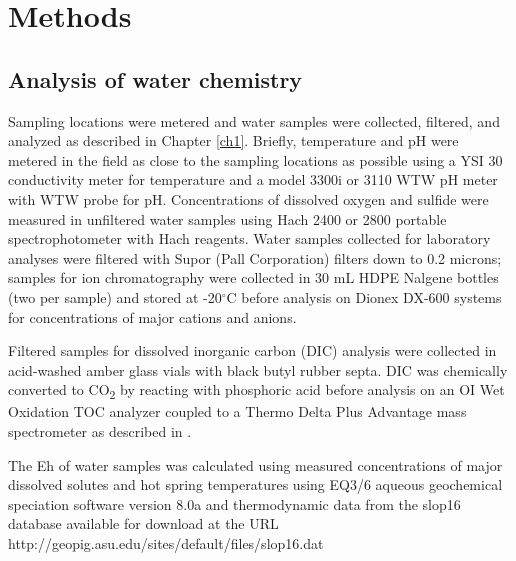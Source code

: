 \section{Methods}
\subsection{Analysis of water chemistry}
Sampling locations were metered and water samples were collected, filtered, and analyzed as described in Chapter \ref{ch1}. Briefly, temperature and pH were metered in the field as close to the sampling locations as possible using a YSI 30 conductivity meter for temperature and a model 3300i or 3110 WTW pH meter with WTW probe for pH. Concentrations of dissolved oxygen and sulfide were measured in unfiltered water samples using Hach 2400 or 2800 portable spectrophotometer with Hach reagents. Water samples collected for laboratory analyses were filtered with Supor (Pall Corporation) filters down to 0.2 microns; samples for ion chromatography were collected in 30 mL HDPE Nalgene bottles (two per sample) and stored at -20$^{\circ}$C before analysis on Dionex DX-600 systems for concentrations of major cations and anions.

Filtered samples for dissolved inorganic carbon (DIC) analysis were collected in acid-washed amber glass vials with black butyl rubber septa. DIC was chemically converted to CO\textsubscript{2} by reacting with phosphoric acid before analysis on an OI Wet Oxidation TOC analyzer coupled to a Thermo Delta Plus Advantage mass spectrometer as described in \cite{havig2011merging}.

The Eh of water samples was calculated using measured concentrations of major dissolved solutes and hot spring temperatures using EQ3/6 aqueous geochemical speciation software version 8.0a \citep{wolery2002eq3} and thermodynamic data from the slop16 database available for download at the URL http://geopig.asu.edu/sites/default/files/slop16.dat

